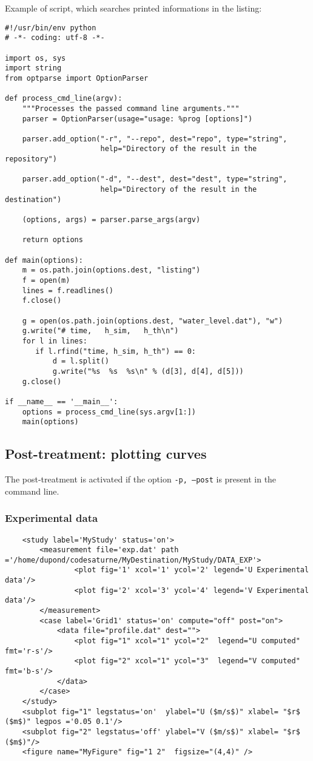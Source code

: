 \documentclass[a4paper,10pt,twoside]{article}
\begin{document}
Example of script, which searches printed informations in the listing:
\begin{verbatim}
#!/usr/bin/env python
# -*- coding: utf-8 -*-

import os, sys
import string
from optparse import OptionParser

def process_cmd_line(argv):
    """Processes the passed command line arguments."""
    parser = OptionParser(usage="usage: %prog [options]")

    parser.add_option("-r", "--repo", dest="repo", type="string",
                      help="Directory of the result in the repository")

    parser.add_option("-d", "--dest", dest="dest", type="string",
                      help="Directory of the result in the destination")

    (options, args) = parser.parse_args(argv)

    return options

def main(options):
    m = os.path.join(options.dest, "listing")
    f = open(m)
    lines = f.readlines()
    f.close()

    g = open(os.path.join(options.dest, "water_level.dat"), "w")
    g.write("# time,   h_sim,   h_th\n")
    for l in lines:
       if l.rfind("time, h_sim, h_th") == 0:
           d = l.split()
           g.write("%s  %s  %s\n" % (d[3], d[4], d[5]))
    g.close()

if __name__ == '__main__':
    options = process_cmd_line(sys.argv[1:])
    main(options)
\end{verbatim}

\subsection{Post-treatment: plotting curves}

The post-treatment is activated if the option \texttt{-p, --post} is present in the command line.

\subsubsection{Experimental data}

\begin{verbatim}
    <study label='MyStudy' status='on'>
        <measurement file='exp.dat' path ='/home/dupond/codesaturne/MyDestination/MyStudy/DATA_EXP'>
                <plot fig='1' xcol='1' ycol='2' legend='U Experimental data'/>
                <plot fig='2' xcol='3' ycol='4' legend='V Experimental data'/>
        </measurement>
        <case label='Grid1' status='on' compute="off" post="on">
            <data file="profile.dat" dest="">
                <plot fig="1" xcol="1" ycol="2"  legend="U computed" fmt='r-s'/>
                <plot fig="2" xcol="1" ycol="3"  legend="V computed" fmt='b-s'/>
            </data>
        </case>
    </study>
    <subplot fig="1" legstatus='on'  ylabel="U ($m/s$)" xlabel= "$r$ ($m$)" legpos ='0.05 0.1'/>
    <subplot fig="2" legstatus='off' ylabel="V ($m/s$)" xlabel= "$r$ ($m$)"/>
    <figure name="MyFigure" fig="1 2"  figsize="(4,4)" />
\end{verbatim}
\end{document}
